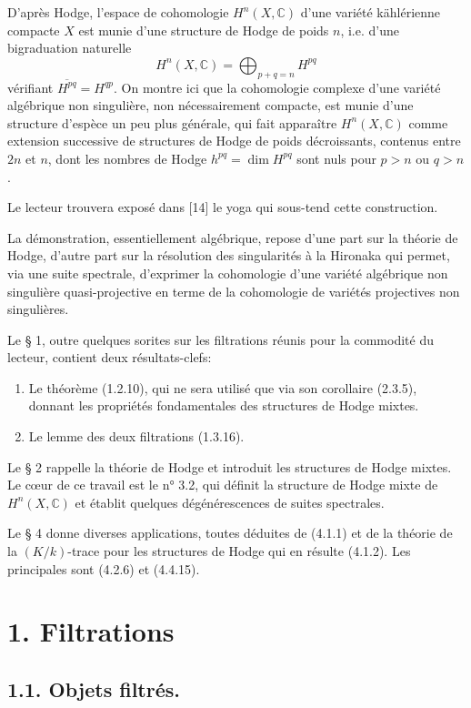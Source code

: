 \documentclass[10pt]{article}
\newcommand{\C}{\mathbb C}
\newcommand{\fg}{\guillemotright}
\newcommand{\og}{\guillemotleft}
\begin{document}
D'après Hodge, l'espace de cohomologie $H^n(X,\C)$ d'une variété kählérienne compacte $X$ est munie d'une \og structure de Hodge\fg{} de poids $n$, i.e. d'une bigraduation naturelle
\[
H^n(X,\C)=\bigoplus_{p+q=n}H^{pq}
\]
vérifiant $\overline{H^{pq}}=H^{qp}$. On montre ici que la cohomologie complexe d'une variété algébrique non singulière, non nécessairement compacte, est munie d'une structure d'espèce un peu plus générale, qui fait apparaître $H^n(X,\C)$ comme \og extension successive\fg{} de structures de Hodge de poids décroissants, contenus entre $2n$ et $n$, dont les nombres de Hodge $h^{pq}=\dim H^{pq}$ sont nuls pour $p>n$ ou $q>n$.

Le lecteur trouvera exposé dans [14] le yoga qui sous-tend cette construction.

La démonstration, essentiellement algébrique, repose d'une part sur la théorie de Hodge, d'autre part sur la résolution des singularités à la Hironaka qui permet, via une suite spectrale, \og d'exprimer\fg{} la cohomologie d'une variété algébrique non singulière quasi-projective en terme de la cohomologie de variétés projectives non singulières.

Le § 1, outre quelques sorites sur les filtrations réunis pour la commodité du lecteur, contient deux résultats-clefs:
\begin{enumerate}[label=\alph*)]
\item Le théorème (1.2.10), qui ne sera utilisé que via son corollaire (2.3.5), donnant les propriétés fondamentales des \og structures de Hodge mixtes\fg{}.
\item Le \og lemme des deux filtrations\fg{} (1.3.16).
\end{enumerate}
Le § 2 rappelle la théorie de Hodge et introduit les structures de Hodge mixtes. Le cœur de ce travail est le n° 3.2, qui définit la structure de Hodge mixte de $H^n(X,\C)$ et établit quelques dégénérescences de suites spectrales.

Le § 4 donne diverses applications, toutes déduites de (4.1.1) et de la théorie de la $(K/k)$-trace pour les structures de Hodge qui en résulte (4.1.2). Les principales sont (4.2.6) et (4.4.15).

\section*{1. Filtrations}
\subsection*{1.1. Objets filtrés.}
\end{document}
